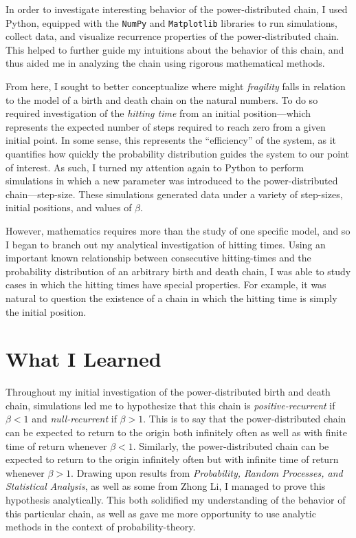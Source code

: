 \documentclass[12pt,letterpaper]{article}
\begin{document}
In order to investigate interesting behavior of the power-distributed chain, I used Python, equipped with
the \texttt{NumPy} and \texttt{Matplotlib} libraries to run simulations, collect data, and visualize
recurrence properties of the power-distributed chain. This helped to further guide my intuitions about
the behavior of this chain, and thus aided me in analyzing the chain using rigorous mathematical
methods.

From here, I sought to better conceptualize where might \emph{fragility} falls in relation to the model
of a birth and death chain on the natural numbers. To do so required investigation of the \emph{hitting
time} from an initial position---which represents the expected number of steps required to reach zero
from a given initial point. In some sense, this represents the ``efficiency'' of the system, as it
quantifies how quickly the probability distribution guides the system to our point of interest. As such,
I turned my attention again to Python to perform simulations in which a new parameter was introduced to
the power-distributed chain---step-size. These simulations generated data under a variety of step-sizes,
initial positions, and values of $\beta$.

However, mathematics requires more than the study of one specific model, and so I began to branch out my
analytical investigation of hitting times. Using an important known relationship between consecutive
hitting-times and the probability distribution of an arbitrary birth and death chain, I was able to
study cases in which the hitting times have special properties. For example, it was natural to question
the existence of a chain in which the hitting time is simply the initial position.

\section*{What I Learned}
Throughout my initial investigation of the power-distributed birth and death chain, simulations led me
to hypothesize that this chain is \emph{positive-recurrent} if $\beta < 1$ and \emph{null-recurrent} if
$\beta > 1$. This is to say that the power-distributed chain can be expected to return to the origin
both infinitely often as well as with finite time of return whenever $\beta < 1$. Similarly, the
power-distributed chain can be expected to return to the origin infinitely often but with infinite time
of return whenever $\beta > 1$. Drawing upon results from \emph{Probability, Random Processes, and
Statistical Analysis}, as well as some from Zhong Li, I managed to prove this hypothesis analytically.
This both solidified my understanding of the behavior of this particular chain, as well as gave me more
opportunity to use analytic methods in the context of probability-theory.
\end{document}

